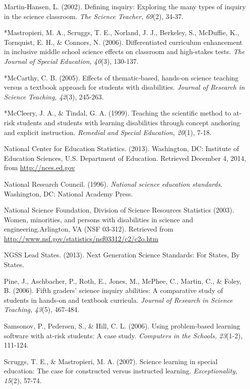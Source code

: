 \documentclass[11.5pt]{sig-alternate} %
\begin{document}
Martin-Hansen, L. (2002).  Defining inquiry: Exploring the many types of inquiry in the science classroom.  \textit{The Science Teacher, 69}(2), 34-37.

*Mastropieri, M. A., Scruggs, T. E., Norland, J. J., Berkeley, S., McDuffie, K., Tornquist, E. H., \& Connors, N. (2006). Differentiated curriculum enhancement in inclusive middle school science effects on classroom and high-stakes tests.  \textit{The Journal of Special Education, 40}(3), 130-137.

*McCarthy, C. B. (2005). Effects of thematic‐based, hands‐on science teaching versus a textbook approach for students with disabilities. \textit{Journal of Research in Science Teaching, 42}(3), 245-263.

*McCleery, J. A., \& Tindal, G. A. (1999). Teaching the scientific method to at-risk students and students with learning disabilities through concept anchoring and explicit instruction. \textit{Remedial and Special Education, 20}(1), 7-18.

National Center for Education Statistics. (2013). Washington, DC: Institute of Education Sciences, U.S. Department of Education. Retrieved December 4, 2014, from \url{http://nces.ed.gov}

National Research Council. (1996). \textit{National science education standards}. Washington, DC: National Academy Press.

National Science Foundation, Division of Science Resources Statistics (2003). Women, minorities, and persons with disabilities in science and engineering.Arlington, VA (NSF 03-312).  Retrieved from \url{http://www.nsf.gov/statistics/nsf03312/c2/c2o.htm}

NGSS Lead States. (2013). Next Generation Science Standards: For States, By States.

Pine, J., Aschbacher, P., Roth, E., Jones, M., McPhee, C., Martin, C., \& Foley, B. (2006). Fifth graders' science inquiry abilities: A comparative study of students in hands‐on and textbook curricula. \textit{Journal of Research in Science Teaching, 43}(5), 467-484.

Samsonov, P., Pedersen, S., \& Hill, C. L. (2006). Using problem-based learning software with at-risk students: A case study. \textit{Computers in the Schools, 23}(1-2), 111-124.

Scruggs, T. E., \& Mastropieri, M. A. (2007). Science learning in special education: The case for constructed versus instructed learning. \textit{Exceptionality, 15}(2), 57-74.
\end{document}
